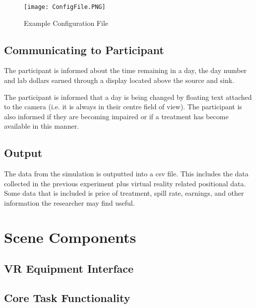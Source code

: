 \documentclass{article}
\begin{document}
\begin{figure}[h!]
\centering
\texttt{[image: ConfigFile.PNG]}
\caption{Example Configuration File}
\label{fig:configfile}
\end{figure}


\subsection{Communicating to Participant}
The participant is informed about the time remaining in a day, the day number and lab dollars earned through a display located above the source and sink. 

The participant is informed that a day is being changed by floating text attached to the camera (i.e. it is always in their centre field of view). The participant is also informed if they are becoming impaired or if a treatment has become available in this manner.

\subsection{Output}
The data from the simulation is outputted into a csv file. This includes the data collected in the previous experiment plus virtual reality related positional data. Some data that is included is price of treatment, spill rate, earnings, and other information the researcher may find useful.


\section{Scene Components}
\subsection{VR Equipment Interface} %



\subsection{Core Task Functionality} %
\end{document}
